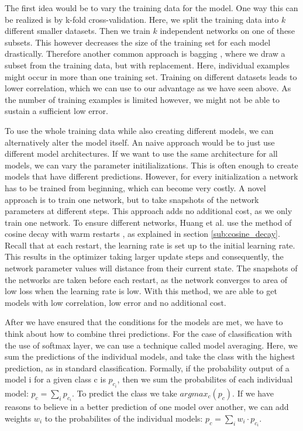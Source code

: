 The first idea would be to vary the training data for the model. One way this
can be realized is by k-fold cross-validation. Here, we split the training data
into $k$ different smaller datasets. Then we train $k$ independent networks on one
of these subsets. This however decreases the size of the training set for each
model drastically. Therefore another common approach is bagging
\cite{breiman1996bagging}, where we draw a subset from the training data, but
with replacement. Here, individual examples might occur in more than one
training set. Training on different datasets leads to lower correlation, which we
can use to our advantage as we have seen above. As the number of training
examples is limited however, we might not be able to sustain a sufficient low
error.

To use the whole training data while also creating different models, we can
alternatively alter the model itself. An naive approach would be to just use
different model architectures. If we want to use the same architecture for all
models, we can vary the parameter initilializations. This is often enough to
create models that have different predictions. However, for every initialization
a network has to be trained from beginning, which can become very costly. A
novel approach is to train one network, but to take snapshots of the network
parameters at different steps. This approach adds no additional cost, as we only
train one network. To ensure different networks, Huang et al.
\cite{huang2017snapshot} use the method of cosine decay with warm restarts
\cite{loshchilov2016sgdr}, as explained in section \ref{sub:cosine_decay}.
Recall that at each restart, the learning rate is set up to the initial learning
rate. This results in the optimizer taking larger update steps and consequently,
the network parameter values will distance from their current state. The
snapshots of the networks are taken before each restart, as the network
converges to area of low loss when the learning rate is low. With this method,
we are able to get models with low correlation, low error and no additional cost.

After we have ensured that the conditions for the models are met, we have to
think about how to combine threi predictions. For the case of classification
with the use of softmax layer, we can use a technique called model averaging.
Here, we sum the predictions of the individual models, and take the class with
the highest prediction, as in standard classification. Formally, if the
probability output of a model i for a given class c is $p_{c_i}$, then we sum
the probabilites of each individual model: $p_c = \sum_i p_{c_i}$. To predict
the class we take $argmax_c(p_c)$. If we have reasons to believe in a better
prediction of one model over another, we can add weights $w_i$ to the
probabilites of the individual models: $p_c = \sum_i w_i \cdot p_{c_i}$.


\begin{comment}
Further aspects that could be included:
- classififcation in general
- cross entropy loss and loss functions
- gradient descent
\end{comment}